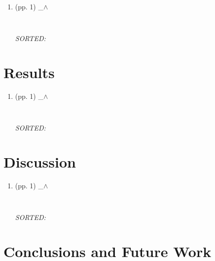 \documentclass[12pt]{article}
\begin{document}
\begin{enumerate}

\item  (pp. 1)  \_$\wedge$  

	\begin{verbatim}
	
	\end{verbatim}
	\textit{
	SORTED:  
	}
	\\


\end{enumerate}



\section{Results}


\begin{enumerate}

\item  (pp. 1)  \_$\wedge$  

	\begin{verbatim}
	
	\end{verbatim}
	\textit{
	SORTED:  
	}
	\\


\end{enumerate}





\section{Discussion}


\begin{enumerate}

\item  (pp. 1)  \_$\wedge$  

	\begin{verbatim}
	
	\end{verbatim}
	\textit{
	SORTED:  
	}
	\\


\end{enumerate}





\section{Conclusions and Future Work}
\end{document}
